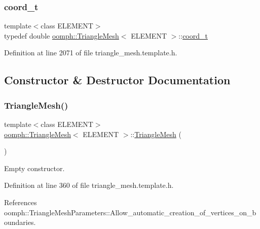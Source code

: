 \subsubsection{\texorpdfstring{coord\+\_\+t}{coord\_t}}
{\footnotesize\ttfamily template$<$class E\+L\+E\+M\+E\+NT$>$ \\
typedef double \hyperlink{classoomph_1_1TriangleMesh}{oomph\+::\+Triangle\+Mesh}$<$ E\+L\+E\+M\+E\+NT $>$\+::\hyperlink{classoomph_1_1TriangleMesh_ad50b14a66b40a3bfb22a43df86c9006e}{coord\+\_\+t}\hspace{0.3cm}{\ttfamily [private]}}



Definition at line 2071 of file triangle\+\_\+mesh.\+template.\+h.



\subsection{Constructor \& Destructor Documentation}
\mbox{\label{classoomph_1_1TriangleMesh_aec6b165889c9e65820d74837c237b7c7}} 
\subsubsection{\texorpdfstring{Triangle\+Mesh()}{TriangleMesh()}\hspace{0.1cm}{\footnotesize\ttfamily [1/5]}}
{\footnotesize\ttfamily template$<$class E\+L\+E\+M\+E\+NT$>$ \\
\hyperlink{classoomph_1_1TriangleMesh}{oomph\+::\+Triangle\+Mesh}$<$ E\+L\+E\+M\+E\+NT $>$\+::\hyperlink{classoomph_1_1TriangleMesh}{Triangle\+Mesh} (\begin{DoxyParamCaption}{ }\end{DoxyParamCaption})\hspace{0.3cm}{\ttfamily [inline]}}



Empty constructor. 



Definition at line 360 of file triangle\+\_\+mesh.\+template.\+h.



References oomph\+::\+Triangle\+Mesh\+Parameters\+::\+Allow\+\_\+automatic\+\_\+creation\+\_\+of\+\_\+vertices\+\_\+on\+\_\+boundaries.

